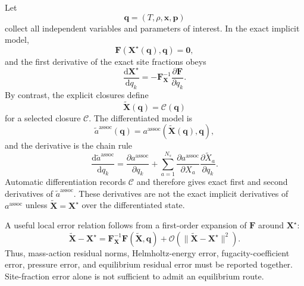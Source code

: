 \documentclass[12pt,letterpaper]{article}
\newcommand{\assoc}{\mathrm{assoc}}
\newcommand{\dd}{\mathrm{d}}
\begin{document}
Let
\begin{equation}
  \mathbf{q} = (T,\rho,\mathbf{x},\mathbf{p})
  \label{eq:q_vector}
\end{equation}
collect all independent variables and parameters of interest. In the exact
implicit model,
\begin{equation}
  \mathbf{F}(\mathbf{X}^\star(\mathbf{q}),\mathbf{q})=\mathbf{0},
  \label{eq:implicit_solution}
\end{equation}
and the first derivative of the exact site fractions obeys
\begin{equation}
  \frac{\dd\mathbf{X}^\star}{\dd q_k}
  =
  -\mathbf{F}_{\mathbf{X}}^{-1}
  \frac{\partial\mathbf{F}}{\partial q_k}.
  \label{eq:implicit_sensitivity}
\end{equation}
By contrast, the explicit closures define
\begin{equation}
  \widetilde{\mathbf{X}}(\mathbf{q})
  =
  \mathcal{C}(\mathbf{q})
  \label{eq:closure_function}
\end{equation}
for a selected closure \(\mathcal{C}\). The differentiated model is
\begin{equation}
  \widetilde{a}^{\assoc}(\mathbf{q})
  =
  a^{\assoc}(\widetilde{\mathbf{X}}(\mathbf{q}),\mathbf{q}),
  \label{eq:explicit_model}
\end{equation}
and the derivative is the chain rule
\begin{equation}
  \frac{\dd\widetilde{a}^{\assoc}}{\dd q_k}
  =
  \frac{\partial a^{\assoc}}{\partial q_k}
  +
  \sum_{a=1}^{N_s}
  \frac{\partial a^{\assoc}}{\partial X_a}
  \frac{\partial \widetilde{X}_a}{\partial q_k}.
  \label{eq:explicit_chain_rule}
\end{equation}
Automatic differentiation records \(\mathcal{C}\) and therefore gives exact
first and second derivatives of \(\widetilde{a}^{\assoc}\). These derivatives
are not the exact implicit derivatives of \(a^\assoc\) unless
\(\widetilde{\mathbf{X}}=\mathbf{X}^\star\) over the differentiated state.

A useful local error relation follows from a first-order expansion of
\(\mathbf{F}\) around \(\mathbf{X}^\star\):
\begin{equation}
  \widetilde{\mathbf{X}}-\mathbf{X}^\star
  =
  \mathbf{F}_{\mathbf{X}}^{-1}
  \mathbf{F}(\widetilde{\mathbf{X}},\mathbf{q})
  +
  \mathcal{O}\!\left(
    \|\widetilde{\mathbf{X}}-\mathbf{X}^\star\|^2
  \right).
  \label{eq:closure_error_relation}
\end{equation}
Thus, mass-action residual norms, Helmholtz-energy error, fugacity-coefficient
error, pressure error, and equilibrium residual error must be reported together.
Site-fraction error alone is not sufficient to admit an equilibrium route.
\end{document}
